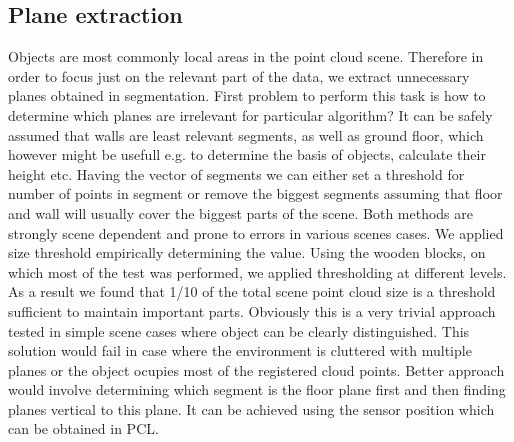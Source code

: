 \documentclass[12pt,oneside]{amsart}
\begin{document}
\subsection{Plane extraction}
Objects are most commonly local areas in the point cloud scene. Therefore in order to focus just on the relevant part of the data, we extract unnecessary planes obtained in segmentation. First problem to perform this task is how to determine which planes are irrelevant for particular algorithm? It can be safely assumed that walls are least relevant segments, as well as ground floor, which however might be usefull e.g. to determine the basis of objects, calculate their height etc.
\newline
\indent Having the vector of segments we can either set a threshold for number of points in segment or remove the biggest segments assuming that floor and wall will usually cover the biggest parts of the scene. Both methods are strongly scene dependent and prone to errors in various scenes cases. We applied size threshold empirically determining the value. Using the wooden blocks, on which most of the test was performed, we applied thresholding at different levels. As a result we found that 1/10 of the total scene point cloud size is a	 threshold sufficient to maintain important parts.
\newline
\indent Obviously this is a very trivial approach tested in simple scene cases where object can be clearly distinguished. This solution would fail in case where the environment is cluttered with multiple planes or the object ocupies most of the registered cloud points. Better approach would involve determining which segment is the floor plane first and then finding planes vertical to this plane. It can be achieved using the sensor position which can be obtained in PCL. 
\end{document}
